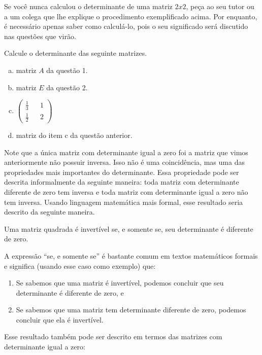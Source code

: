 \documentclass[main_estudante.tex]{subfiles}
\begin{document}
Se você nunca calculou o determinante de uma matriz $2x2$, peça ao seu tutor ou a um colega que lhe explique o procedimento exemplificado acima. Por enquanto, é necessário apenas saber como calculá-lo, pois o seu significado será discutido nas questões que virão.

\begin{questao}
Calcule o determinante das seguinte matrizes.
\begin{enumerate}[a)]
\item matriz $A$ da questão 1.
\item matriz $E$ da questão 2.
\item $\begin{pmatrix} \frac{1}{3} && 1 \\ \frac{1}{2} && 2 \end{pmatrix}$
\item matriz do item c da questão anterior.
\end{enumerate}
\end{questao}

Note que a única matriz com determinante igual a zero foi a matriz que vimos anteriormente não possuir inversa. Isso não é uma coincidência, mas uma das propriedades mais importantes do determinante. Essa propriedade pode ser descrita informalmente da seguinte maneira: toda matriz com determinante diferente de zero tem inversa e toda matriz com determinante igual a zero não tem inversa. Usando linguagem matemática mais formal, esse resultado seria descrito da seguinte maneira.

\begin{teorema}
 Uma matriz quadrada é invertível se, e somente se, seu determinante é diferente de zero.
\end{teorema}

A expressão ``se, e somente se'' é bastante comum em textos matemáticos formais e significa (usando esse caso como exemplo) que:

\begin{enumerate}
 \item Se sabemos que uma matriz é invertível, podemos concluir que seu determinante é diferente de zero, e
 \item Se sabemos que uma matriz tem determinante diferente de zero, podemos concluir que ela é invertível.
\end{enumerate}

Esse resultado também pode ser descrito em termos das matrizes com determinante igual a zero:
\end{document}
